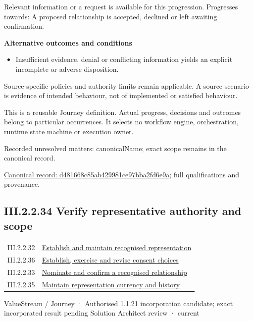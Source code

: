 Relevant information or a request is available for this progression. Progresses towards: A proposed relationship is accepted, declined or left awaiting confirmation.



\par\medskip\textbf{Alternative outcomes and conditions}\par


\begin{itemize}


\item Insufficient evidence, denial or conflicting information yields an explicit incomplete or adverse disposition.

\end{itemize}


Source-specific policies and authority limits remain applicable. A source scenario is evidence of intended behaviour, not of implemented or satisfied behaviour.



This is a reusable Journey definition. Actual progress, decisions and outcomes belong to particular occurrences. It selects no workflow engine, orchestration, runtime state machine or execution owner.


{\small Recorded unresolved matters: canonicalName; exact scope remains in the canonical record.}\par
{\footnotesize \href{../../../../../../../continuum/strategy/value-stream/d481668c85ab429981ce97bba2fd6e9a.md}{Canonical record: d481668c85ab429981ce97bba2fd6e9a}; full qualifications and provenance.}\par
\subsection*{III.2.2.34 Verify representative authority and scope}
\label{navigation:III.2.2.34}

\begin{longtable}{p{.22\linewidth}p{.73\linewidth}}
III.2.2.32 & \hyperref[element:45372a8e0fc64dd3ba0f2cc4b14b0ee3]{Establish and maintain recognised representation} \\
III.2.2.36 & \hyperref[element:850bba32295c4e53b20036b80f77f491]{Establish, exercise and revise consent choices} \\
III.2.2.33 & \hyperref[element:d481668c85ab429981ce97bba2fd6e9a]{Nominate and confirm a recognised relationship} \\
III.2.2.35 & \hyperref[element:fa9998f53cd64832abe79b40904440f5]{Maintain representation currency and history} \\
\end{longtable}
\label{element:ee60990709724506905c5dbe8e21261a}
{\small ValueStream / Journey · Authorised 1.1.21 incorporation candidate; exact incorporated result pending Solution Architect review · current}\par

